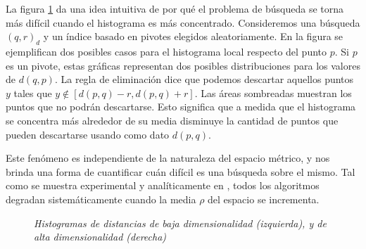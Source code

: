 La figura \ref{dim1} da una idea intuitiva de por qu\'e el problema
de b\'usqueda se torna m\'as dif\'icil cuando el histograma es m\'as
concentrado. Consideremos una b\'usqueda $(q,r)_{d}$ y un \'indice
basado en pivotes elegidos aleatoriamente.
En la figura se ejemplifican dos posibles casos para el histograma
local respecto del punto $p$. Si $p$ es un pivote, estas gr\'aficas
representan dos posibles distribuciones para los valores de
$d(q,p)$. La regla de eliminaci\'on dice que podemos descartar aquellos
puntos $y$ tales que  $y \notin [d(p,q)-r, d(p,q) + r]$. Las \'areas sombreadas
muestran  los puntos que no podr\'an descartarse. Esto significa que a medida
que el histograma se concentra m\'as alrededor de su media disminuye la
cantidad de puntos que pueden descartarse usando como dato $d(p,q)$.

Este fen\'omeno es independiente de la naturaleza del espacio
m\'etrico,  y nos brinda una forma de cuantificar cu\'an dif\'icil es una
b\'usqueda sobre el mismo. Tal como se muestra experimental y anal\'iticamente
en \cite{oursurvey}, todos los algoritmos degradan  sistem\'aticamente
cuando la media $\rho$ del espacio se incrementa.

\begin{figure}[tb]
\centerline{%
  }
  \caption [Histogramas de distancias de baja y
             alta dimensionalidad]
    { \textsl{\footnotesize Histogramas de distancias de baja dimensionalidad
                (izquierda), y  de alta dimensionalidad (derecha)}}
\label{dim1}
\end{figure}

